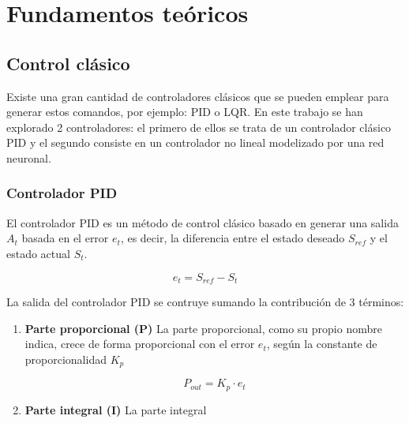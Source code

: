 \chapter{Fundamentos teóricos}

\section{Control clásico}





Existe una gran cantidad de controladores clásicos que se pueden emplear para generar estos comandos, por ejemplo: PID o LQR.
En este trabajo se han explorado 2 controladores: el primero de ellos se trata de un controlador clásico PID y el segundo consiste en un controlador no lineal modelizado por una red neuronal.

\subsection{Controlador PID}

El controlador PID es un método de control clásico basado en generar una salida $A_t$ basada en el error $e_t$, es decir, la diferencia entre el estado deseado $S_{ref}$ y el estado actual $S_t$.

\begin{equation}
e_t= S_{ref} - S_t
\end{equation}

La salida del controlador PID se contruye sumando la contribución de 3 términos:
\begin{enumerate}
	\item \textbf{Parte proporcional (P)}
	La parte proporcional, como su propio nombre indica, crece de forma proporcional con el error $e_t$, según la constante de proporcionalidad $K_p$
	
	\begin{equation}
	P_{out}=K_p \cdot e_t
	\end{equation} 
	\item \textbf{Parte integral (I)}
	La parte integral	
	
\end{enumerate}	


